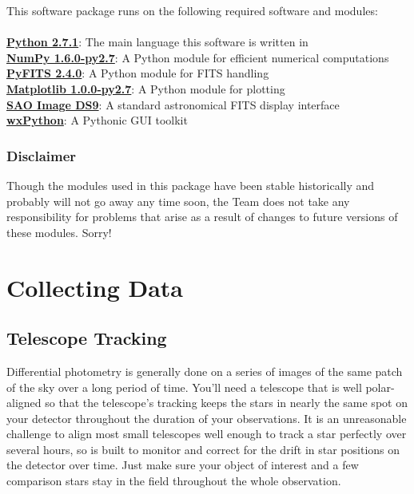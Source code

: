 \documentclass{article}
\begin{document}
This software package runs on the following required software and modules:  \\ \\
\noindent
\indent \href{http://www.python.org/getit/}{\textbf{Python 2.7.1}}: The main language this software is written in \\
\indent \href{http://new.scipy.org/download.html}{\textbf{NumPy 1.6.0-py2.7}}: A Python module for efficient numerical computations \\
\indent \href{http://www.stsci.edu/resources/software_hardware/pyfits/}{\textbf{PyFITS 2.4.0}}: A Python module for FITS handling \\
\indent \href{http://matplotlib.sourceforge.net/index.html}{\textbf{Matplotlib 1.0.0-py2.7}}: A Python module for plotting\\
\indent \href{http://hea-www.harvard.edu/RD/ds9/}{\textbf{SAO Image DS9}}: A standard astronomical FITS display interface \\
\indent \href{http://www.wxpython.org/download.php#stable}{\textbf{wxPython}}: A Pythonic GUI toolkit


\subsubsection{Disclaimer}

Though the modules used in this package have been stable historically and probably will not go away any time soon, the \oscaar Team does not take any responsibility for problems that arise as a result of changes to future versions of these modules. Sorry!

\section{Collecting Data} \label{sec:collectingData}
\subsection{Telescope Tracking}

Differential photometry is generally done on a series of images of the same patch of the sky over a long period of time. You'll need a telescope that is well polar-aligned so that the telescope's tracking keeps the stars in nearly the same spot on your detector throughout the duration of your observations. It is an unreasonable challenge to align most small telescopes well enough to track a star perfectly over several hours, so \oscaar is built to monitor and correct for the drift in star positions on the detector over time. Just make sure your object of interest and a few comparison stars stay in the field throughout the whole observation. 
\end{document}
